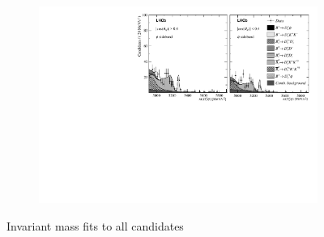 \begin{figure}[!h]
\begin{subfigure}[t]{1.0\textwidth}
    \end{subfigure}
    \begin{subfigure}[t]{1.0\textwidth}
        \centering
        \includegraphics[width=1.0\textwidth]{figs/Appendix_FitCategories/canvas_DsPhiSide_merged_both_summed_splitHel_splitKKPi_s21_s21r1_s24_s26.pdf}\\
    \end{subfigure}
    \caption{Invariant mass fits to all \decay{\Bp}{\Dsp\phiz} candidates}
\end{figure}




